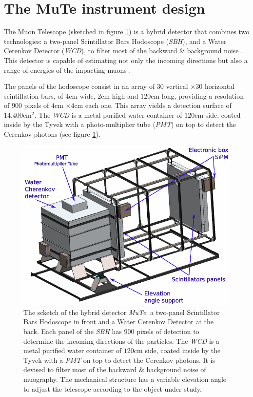 \documentclass[submitting]{nst}
\begin{document}

\section{The MuTe instrument design}
The Muon Telescope (sketched in figure \ref{fig:mute-detector}) is a hybrid detector that combines two technologies: a two-panel Scintillator Bars Hodoscope (\textsl{SBH}),  and a Water Cerenkov Detector (\textsl{WCD}), to filter most of the backward \& background noise \cite{NishiyamaMiyamotoNaganawa2014, KusagayaTanaka2015, NishiyamaEtal2016, GomezEtal2017}. This detector is capable of estimating not only the incoming  directions but also a range of energies of the impacting muons \cite{AsoreyEtal2017B}.
  
 The panels of the hodoscope consist in an array of $30$ vertical $\times 30$ horizontal scintillation bars, of $4$cm wide, $2$cm high and $120$cm long, providing a resolution of $900$ pixels of $4$cm $\times 4$cm each one. This array yields a detection surface of $14.400$cm$^2$. The \textsl{WCD} is a metal purified water container of $120$cm side, coated inside by the Tyvek with a photo-multiplier tube (\textsl{PMT}) on top to detect the Cerenkov photons (see figure \ref{fig:mute-detector}).

\begin{figure}
    \centering
    \includegraphics[scale=0.3]{Figures/mute-detector.png}
    \caption{The scketch of the hybrid detector \textsl{MuTe}: a two-panel Scintillator Bars Hodoscope in front and a Water Cerenkov Detector at the back. Each panel of the \textsl{SBH} has $900$ pixels of detection to determine the incoming directions of the particles. The \textsl{WCD} is a metal purified water container of $120$cm side, coated inside by the Tyvek with a \textsl{PMT} on top to detect the Cerenkov photons. It is devised to filter most of the backward \& background noise of muography. The mechanical structure has a variable elevation angle to adjust the telescope according to the object under study.} 
    \label{fig:mute-detector}
\end{figure}
\end{document}
